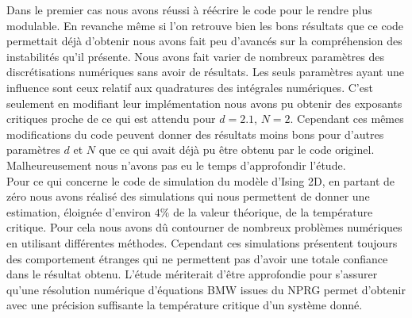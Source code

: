 \documentclass[10.5pt]{article}
\begin{document}
\begin{multicols}{2}
Dans le premier cas nous avons réussi à réécrire le code pour le rendre plus modulable. En revanche même si l'on retrouve bien les bons résultats que ce code permettait déjà d'obtenir nous avons fait peu d'avancés sur la compréhension des instabilités qu'il présente. Nous avons fait varier de nombreux paramètres des discrétisations numériques sans avoir de résultats. Les seuls paramètres ayant une influence sont ceux relatif aux quadratures des intégrales numériques. C'est seulement en modifiant leur implémentation nous avons pu obtenir des exposants critiques proche de ce qui est attendu pour $d=2.1$, $N=2$. Cependant ces mêmes modifications du code peuvent donner des résultats moins bons pour d'autres paramètres $d$ et $N$ que ce qui avait déjà pu être obtenu par le code originel. Malheureusement nous n'avons pas eu le temps d'approfondir l'étude. \\


Pour ce qui concerne le code de simulation du modèle d'Ising 2D, en partant de zéro nous avons réalisé des simulations qui nous permettent de donner une estimation, éloignée d'environ $4 \%$ de la valeur théorique, de la température critique. Pour cela nous avons dû contourner de nombreux problèmes numériques en utilisant différentes méthodes. Cependant ces simulations présentent toujours des comportement étranges qui ne permettent pas d'avoir une totale confiance dans le résultat obtenu. L'étude mériterait d'être approfondie pour s'assurer qu'une résolution numérique d'équations BMW issues du NPRG permet d'obtenir avec une précision suffisante la température critique d'un système donné.

\vfill

\pagebreak





\end{multicols}


\pagebreak

\appendix
\end{document}
